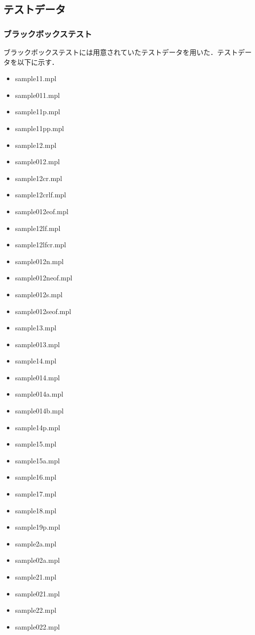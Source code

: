 \documentclass{jlreq}
\begin{document}
\subsection{テストデータ}
\subsubsection{ブラックボックステスト}
ブラックボックステストには用意されていたテストデータを用いた．テストデータを以下に示す．
\begin{itemize}
  \item sample11.mpl
  \item sample011.mpl
  \item sample11p.mpl
  \item sample11pp.mpl
  \item sample12.mpl
  \item sample012.mpl
  \item sample12cr.mpl
  \item sample12crlf.mpl
  \item sample012eof.mpl
  \item sample12lf.mpl
  \item sample12lfcr.mpl
  \item sample012n.mpl
  \item sample012neof.mpl
  \item sample012s.mpl
  \item sample012seof.mpl
  \item sample13.mpl
  \item sample013.mpl
  \item sample14.mpl
  \item sample014.mpl
  \item sample014a.mpl
  \item sample014b.mpl
  \item sample14p.mpl
  \item sample15.mpl
  \item sample15a.mpl
  \item sample16.mpl
  \item sample17.mpl
  \item sample18.mpl
  \item sample19p.mpl
  \item sample2a.mpl
  \item sample02a.mpl
  \item sample21.mpl
  \item sample021.mpl
  \item sample22.mpl
  \item sample022.mpl

\end{itemize}
\end{document}
